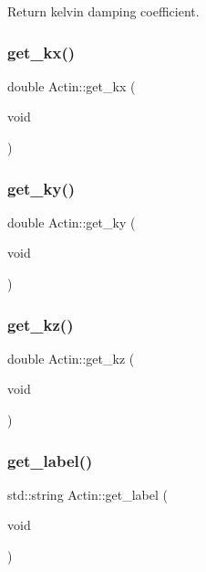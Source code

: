 Return kelvin damping coefficient. \mbox{\label{classActin_a4f87741b64dc265de0b2cb466164e7ac}} 
\subsubsection{\texorpdfstring{get\_kx()}{get\_kx()}}
{\footnotesize\ttfamily double Actin\+::get\+\_\+kx (\begin{DoxyParamCaption}\item[{void}]{ }\end{DoxyParamCaption})\hspace{0.3cm}{\ttfamily [inline]}}

\mbox{\label{classActin_a23b09ce0aaa28c9a7a74a52d9d1d5a93}} 
\subsubsection{\texorpdfstring{get\_ky()}{get\_ky()}}
{\footnotesize\ttfamily double Actin\+::get\+\_\+ky (\begin{DoxyParamCaption}\item[{void}]{ }\end{DoxyParamCaption})\hspace{0.3cm}{\ttfamily [inline]}}

\mbox{\label{classActin_a1837de15df7fd87c331af0ecbf1fbbd1}} 
\subsubsection{\texorpdfstring{get\_kz()}{get\_kz()}}
{\footnotesize\ttfamily double Actin\+::get\+\_\+kz (\begin{DoxyParamCaption}\item[{void}]{ }\end{DoxyParamCaption})\hspace{0.3cm}{\ttfamily [inline]}}

\mbox{\label{classActin_aebeb549997f6d414aee3d1661363877e}} 
\subsubsection{\texorpdfstring{get\_label()}{get\_label()}}
{\footnotesize\ttfamily std\+::string Actin\+::get\+\_\+label (\begin{DoxyParamCaption}\item[{void}]{ }\end{DoxyParamCaption})\hspace{0.3cm}{\ttfamily [inline]}}

